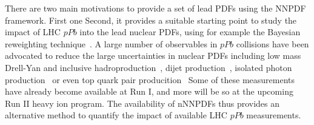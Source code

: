 There are two main motivations to provide a set of lead PDFs using the NNPDF framework.
%
First one
%
Second, it provides a suitable starting point to study the impact of LHC $pPb$ into the lead
nuclear PDFs, using for example the Bayesian reweighting technique~\cite{Ball:2011gg,Ball:2010gb}.
%
A large number of observables in $pPb$ collisions have been advocated to reduce the
large uncertainties in nuclear PDFs including low mass Drell-Yan and inclusive
hadroproduction~\cite{Armesto:2013kqa}, dijet production~\cite{Paukkunen:2014pha,Eskola:2013aya},
isolated photon production~\cite{Helenius:2014qla} or even top quark
pair producition~\cite{d'Enterria:2015jna}
%
Some of these measurements have already become available at Run I, and more will be so
at the upcoming Run II heavy ion program.
%
The availability of nNNPDFs thus provides an alternative method to quantify the impact
of available LHC $pPb$ measurements.


